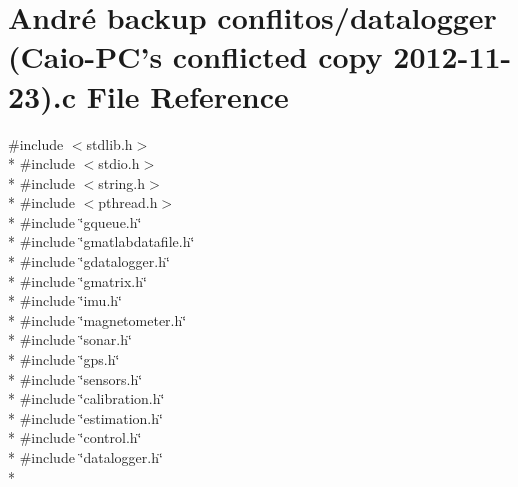 \hypertarget{datalogger_01_07Caio-PC's_01conflicted_01copy_012012-11-23_08_8c}{\section{André backup conflitos/datalogger (Caio-\/\-P\-C's conflicted copy 2012-\/11-\/23).c File Reference}
\label{datalogger_01_07Caio-PC's_01conflicted_01copy_012012-11-23_08_8c}
}
{\ttfamily \#include $<$stdlib.\-h$>$}\\*
{\ttfamily \#include $<$stdio.\-h$>$}\\*
{\ttfamily \#include $<$string.\-h$>$}\\*
{\ttfamily \#include $<$pthread.\-h$>$}\\*
{\ttfamily \#include \char`\"{}gqueue.\-h\char`\"{}}\\*
{\ttfamily \#include \char`\"{}gmatlabdatafile.\-h\char`\"{}}\\*
{\ttfamily \#include \char`\"{}gdatalogger.\-h\char`\"{}}\\*
{\ttfamily \#include \char`\"{}gmatrix.\-h\char`\"{}}\\*
{\ttfamily \#include \char`\"{}imu.\-h\char`\"{}}\\*
{\ttfamily \#include \char`\"{}magnetometer.\-h\char`\"{}}\\*
{\ttfamily \#include \char`\"{}sonar.\-h\char`\"{}}\\*
{\ttfamily \#include \char`\"{}gps.\-h\char`\"{}}\\*
{\ttfamily \#include \char`\"{}sensors.\-h\char`\"{}}\\*
{\ttfamily \#include \char`\"{}calibration.\-h\char`\"{}}\\*
{\ttfamily \#include \char`\"{}estimation.\-h\char`\"{}}\\*
{\ttfamily \#include \char`\"{}control.\-h\char`\"{}}\\*
{\ttfamily \#include \char`\"{}datalogger.\-h\char`\"{}}\\*
